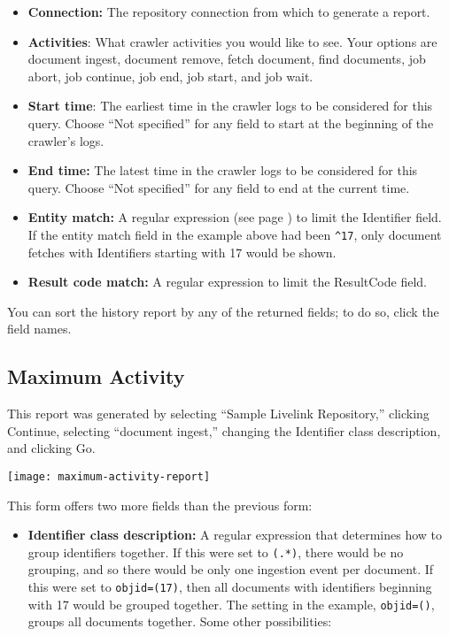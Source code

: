\begin{changemargin}{1.5in}{0in}
\begin{itemize}

\item \textbf{Connection:} The repository connection from which to generate
a report.

\item \textbf{Activities}: What crawler activities you would like to see. 
Your options are document ingest, document remove, fetch document, find 
documents, job abort, job continue, job end, job start, and job wait. 

\item \textbf{Start time}: The earliest time in the crawler logs to be
considered for this query.  Choose ``Not specified'' for any field to
start at the beginning of the crawler's logs.

\item \textbf{End time:} The latest time in the crawler logs to be
considered for this query. Choose ``Not specified'' for any field 
to end at the current time.

\item \textbf{Entity match:} A regular expression (see page
\pageref{regex}) to limit the Identifier field. If the entity match
field in the example above had been \texttt{\^{}17}, only document
fetches with Identifiers starting with 17 would be shown.

\item \textbf{Result code match:} A regular expression to limit the
ResultCode field.

\end{itemize}

You can sort the history report by any of the returned fields; to do so,
click the field names.


\subsection{Maximum Activity}

This report was generated by selecting ``Sample Livelink Repository,''
clicking Continue, selecting ``document ingest,'' changing the Identifier
class description, and clicking Go.

\texttt{[image: maximum-activity-report]}

This form offers two more fields than the previous form:

\begin{itemize}

\item \textbf{Identifier class description:} A regular expression
that determines how to group identifiers together. If this were set to
\texttt{(.*)}, there would be no grouping, and so there would be only one
ingestion event per document. If this were set to \texttt{objid=(17)},
then all documents with identifiers beginning with 17 would be grouped
together. The setting in the example, \texttt{objid=()}, groups all
documents together. Some other possibilities:


\end{itemize}
\end{changemargin}
